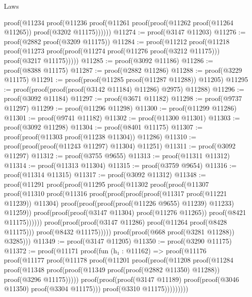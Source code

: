 \begin{lexlean}{Laws}
\begin{coremodule}
      proof(@11234
          proof(@11236
              proof(@11261 proof(proof(@11262 proof(@11264 @11265)) proof(@3202 @11175))))))
@11274 := proof(@3147 @11203)
@11276 := proof(@2882 proof(@3209 @11175))
@11284 := proof(@11212
      proof(@11218
          proof(@11273 proof(proof(@11274 proof(@11276 proof(@3212 @11175))) proof(@3217 @11175)))))
@11285 := proof(@3092 @11186)
@11286 := proof(@8388 @11175)
@11287 := proof(@2882 @11286)
@11288 := proof(@3229 @11175)
@11291 := proof(proof(@11285 proof(@11287 @11288)) @11205)
@11295 := proof(proof(proof(proof(@3142 @11184) @11286) @2975) @11288)
@11296 := proof(@3092 @11184)
@11297 := proof(@3671 @11182)
@11298 := proof(@9737 @11297)
@11299 := proof(@11296 @11298)
@11300 := proof(@11299 @11286)
@11301 := proof(@9741 @11182)
@11302 := proof(@11300 @11301)
@11303 := proof(@3092 @11298)
@11304 := proof(@8401 @11175)
@11307 := proof(proof(@11303 proof(@11238 @11304)) @11286)
@11310 := proof(proof(proof(@11243 @11297) @11304) @11251)
@11311 := proof(@3092 @11297)
@11312 := proof(@3755 @9655)
@11313 := proof(@11311 @11312)
@11314 := proof(@11313 @11304)
@11315 := proof(@3759 @9654)
@11316 := proof(@11314 @11315)
@11317 := proof(@3092 @11312)
@11348 := proof(@11291
      proof(proof(@11295
            proof(@11302
                proof(proof(@11307
                      proof(@11310
                          proof(@11316
                              proof(proof(proof(proof(@11317 proof(@11221 @11239)) @11304)
                                    proof(proof(proof(proof(@11226 @9655) @11239) @11233) @11259))
                                  proof(proof(proof(@3147 @11304) proof(@11276 @11265))
                                      proof(@8421 @11175))))))
                    proof(proof(proof(@3147 @11286) proof(@11264 proof(@8428 @11175)))
                        proof(@8432 @11175)))))
          proof(proof(@668 proof(@3281 @11288)) @3285)))
@11349 := proof(@3147 @11205)
@11350 := proof(@3290 @11175)
@11372 := proof(@11171
      proof(fun (h₁ : @11162) =>
        proof(@11176
            proof(@11177
                proof(@11178
                    proof(@11201
                        proof(proof(@11208
                              proof(@11284
                                  proof(@11348
                                      proof(proof(@11349 proof(proof(@2882 @11350) @11288))
                                          proof(@3296 @11175)))))
                            proof(proof(proof(@3147 @11189)
                                  proof(proof(@3046 @11350) proof(@3304 @11175)))
                                proof(@3310 @11175)))))))))

\end{coremodule}
\end{lexlean}
